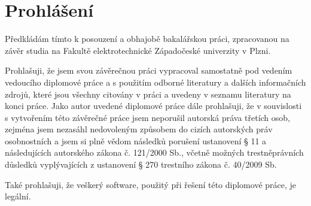 \chapter*{Prohlášení}
Předkládám tímto k posouzení a obhajobě bakalářskou práci, zpracovanou na závěr studia
na Fakultě elektrotechnické Západočeské univerzity v Plzni.

Prohlašuji, že jsem svou závěrečnou práci vypracoval samostatně pod vedením vedoucího
diplomové práce a s použitím odborné literatury a dalších informačních zdrojů, které
jsou všechny citovány v práci a uvedeny v seznamu literatury na konci práce. Jako autor
uvedené diplomové práce dále prohlašuji, že v souvislosti s vytvořením této závěrečné
práce jsem neporušil autorská práva třetích osob, zejména jsem nezasáhl nedovoleným
způsobem do cizích autorských práv osobnostních a jsem si plně vědom následků porušení
ustanovení § 11 a následujících autorského zákona č. 121/2000 Sb., včetně možných
trestněprávních důsledků vyplývajících z ustanovení § 270 trestního zákona č. 40/2009 Sb.

Také prohlašuji, že veškerý software, použitý při řešení této diplomové práce, je legální.